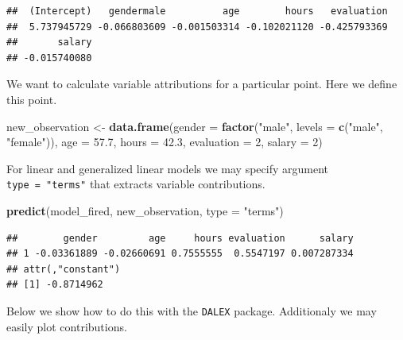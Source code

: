 \documentclass[]{krantz}
\newenvironment{Shaded}{\begin{snugshade}}{\end{snugshade}}
\newcommand{\DataTypeTok}[1]{\textcolor[rgb]{0.13,0.29,0.53}{#1}}
\newcommand{\DecValTok}[1]{\textcolor[rgb]{0.00,0.00,0.81}{#1}}
\newcommand{\FloatTok}[1]{\textcolor[rgb]{0.00,0.00,0.81}{#1}}
\newcommand{\KeywordTok}[1]{\textcolor[rgb]{0.13,0.29,0.53}{\textbf{#1}}}
\newcommand{\NormalTok}[1]{#1}
\newcommand{\OperatorTok}[1]{\textcolor[rgb]{0.81,0.36,0.00}{\textbf{#1}}}
\newcommand{\StringTok}[1]{\textcolor[rgb]{0.31,0.60,0.02}{#1}}
\theoremstyle{definition}
\theoremstyle{definition}
\theoremstyle{definition}
\theoremstyle{remark}
\begin{document}
\begin{verbatim}
##  (Intercept)   gendermale          age        hours   evaluation 
##  5.737945729 -0.066803609 -0.001503314 -0.102021120 -0.425793369 
##       salary 
## -0.015740080
\end{verbatim}

We want to calculate variable attributions for a particular point. Here
we define this point.

\begin{Shaded}
\begin{Highlighting}[]
\NormalTok{new_observation <-}\StringTok{ }\KeywordTok{data.frame}\NormalTok{(}\DataTypeTok{gender =} \KeywordTok{factor}\NormalTok{(}\StringTok{"male"}\NormalTok{, }\DataTypeTok{levels =} \KeywordTok{c}\NormalTok{(}\StringTok{"male"}\NormalTok{, }\StringTok{"female"}\NormalTok{)),}
                      \DataTypeTok{age =} \FloatTok{57.7}\NormalTok{,}
                      \DataTypeTok{hours =} \FloatTok{42.3}\NormalTok{,}
                      \DataTypeTok{evaluation =} \DecValTok{2}\NormalTok{,}
                      \DataTypeTok{salary =} \DecValTok{2}\NormalTok{)}
\end{Highlighting}
\end{Shaded}

For linear and generalized linear models we may specify argument
\texttt{type\ =\ "terms"} that extracts variable contributions.

\begin{Shaded}
\begin{Highlighting}[]
\KeywordTok{predict}\NormalTok{(model_fired, new_observation, }\DataTypeTok{type =} \StringTok{"terms"}\NormalTok{)}
\end{Highlighting}
\end{Shaded}

\begin{verbatim}
##        gender         age     hours evaluation      salary
## 1 -0.03361889 -0.02660691 0.7555555  0.5547197 0.007287334
## attr(,"constant")
## [1] -0.8714962
\end{verbatim}

Below we show how to do this with the \texttt{DALEX} package.
Additionaly we may easily plot contributions.

\begin{Shaded}
\end{Shaded}
\end{document}
